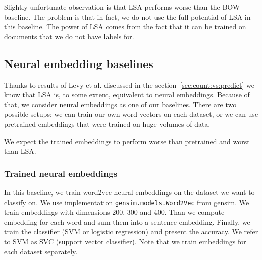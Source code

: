     Slightly unfortunate observation is that LSA performs worse than the BOW baseline. 
    The problem is that in fact, we do not use the full potential of LSA in this baseline.
    The power of LSA comes from the fact that it can be trained on documents that we do not have labels for.

    \subsection{Neural embedding baselines}
    
    Thanks to results of Levy et al.\cite{levy2014neural} discussed in the section~\ref{sec:count:vs:predict} we know that LSA is, to some extent, equivalent to neural embeddings.
    Because of that, we consider neural embeddings as one of our baselines.
    There are two possible setups: we can train our own word vectors on each dataset, or we can use pretrained embeddings that were trained on huge volumes of data.
    
    We expect the trained embeddings to perform worse than pretrained and worst than LSA.
    
    \subsubsection{Trained neural embeddings}
    In this baseline, we train word2vec neural embeddings on the dataset we want to classify on. 
    We use implementation \texttt{gensim.models.Word2Vec} from gensim.
    We train embeddings with dimensions $200$, $300$ and $400$. 
    Than we compute embedding for each word and sum them into a sentence embedding.
    Finally, we train the classifier (SVM or logistic regression) and present the accuracy.
    We refer to SVM as SVC (support vector classifier).
    Note that we train embeddings for each dataset separately.

